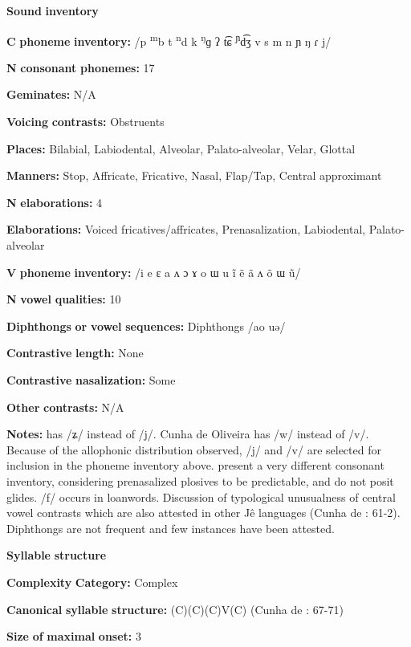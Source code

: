 \textbf{Sound} \textbf{inventory}

\textbf{C} \textbf{phoneme} \textbf{inventory:} /p \textsuperscript{m}b t \textsuperscript{n}d k \textsuperscript{ŋ}ɡ ʔ t͡ɕ \textsuperscript{ɲ}d͡ʒ v s m n ɲ ŋ ɾ j/

\textbf{N} \textbf{consonant} \textbf{phonemes:} 17

\textbf{Geminates:} N/A

\textbf{Voicing} \textbf{contrasts:} Obstruents

\textbf{Places:} Bilabial, Labiodental, Alveolar, Palato-alveolar, Velar, Glottal

\textbf{Manners:} Stop, Affricate, Fricative, Nasal, Flap/Tap, Central approximant

\textbf{N} \textbf{elaborations:} 4

\textbf{Elaborations:} Voiced fricatives/affricates, Prenasalization, Labiodental, Palato-alveolar

\textbf{V} \textbf{phoneme} \textbf{inventory:} /i e ɛ a ʌ ɔ ɤ o ɯ u ĩ ẽ ã ʌ õ ɯ ũ/

\textbf{N} \textbf{vowel} \textbf{qualities:} 10

\textbf{Diphthongs} \textbf{or} \textbf{vowel} \textbf{sequences:} Diphthongs /ao uə/

\textbf{Contrastive} \textbf{length:} None

\textbf{Contrastive} \textbf{nasalization:} Some

\textbf{Other} \textbf{contrasts:} N/A

\textbf{Notes:} \citet{Ham2009} has /ʑ/ instead of /j/. Cunha de Oliveira has /w/ instead of /v/. Because of the allophonic distribution observed, /j/ and /v/ are selected for inclusion in the phoneme inventory above. \citet{BurgessHam1968} present a very different consonant inventory, considering prenasalized plosives to be predictable, and do not posit glides. /f/ occurs in loanwords. Discussion of typological unusualness of central vowel contrasts which are also attested in other Jê languages (Cunha de \citealt{Oliveira2005}: 61-2). Diphthongs are not frequent and few instances have been attested.

\textbf{Syllable} \textbf{structure}

\textbf{Complexity} \textbf{Category:} Complex

\textbf{Canonical} \textbf{syllable} \textbf{structure:} (C)(C)(C)V(C) (Cunha de \citealt{Oliveira2005}: 67-71)

\textbf{Size} \textbf{of} \textbf{maximal} \textbf{onset:} 3

